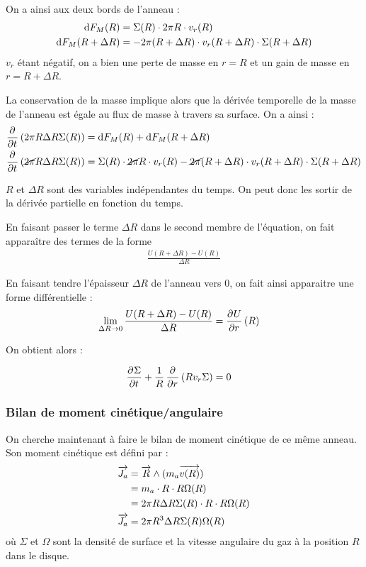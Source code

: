 On a ainsi aux deux bords de l'anneau :
\begin{subequations}
\begin{align}
\operatorname{d \!} F_M(R) &= \Sigma(R) \cdot 2\pi R \cdot v_r(R)\\
\operatorname{d \!} F_M(R+\Delta R) &= - 2\pi (R+\Delta R) \cdot v_r(R+\Delta R) \cdot \Sigma(R+\Delta R)
\end{align}\label{eq:dif_F_M}
\end{subequations}
$v_r$ étant négatif, on a bien une perte de masse en $r=R$ et un gain de masse en $r=R+\Delta R$.

La conservation de la masse implique alors que la dérivée temporelle de la masse de l'anneau est égale au flux de masse à travers sa surface. On a ainsi : 
\begin{align*}
\mathinner{ \dfrac{\partial{^{}}}{\partial{{t}^{}}} }\left(2\pi R \Delta R \Sigma(R)\right) &= \operatorname{d \!} F_M(R) + \operatorname{d \!} F_M(R+\Delta R)\\
\mathinner{ \dfrac{\partial{^{}}}{\partial{{t}^{}}} }\left(\cancel{2\pi}R \Delta R \Sigma(R)\right) &= \Sigma(R) \cdot \cancel{2\pi} R \cdot v_r(R) - \cancel{2\pi} (R+\Delta R) \cdot v_r(R+\Delta R) \cdot \Sigma(R+\Delta R)
\end{align*}

$R$ et $\Delta R$ sont des variables indépendantes du temps. On peut donc les sortir de la dérivée partielle en fonction du temps. 

En faisant passer le terme $\Delta R$ dans le second membre de l'équation, on fait apparaître des termes de la forme 
\begin{align*}
\frac{U(R+\Delta R) - U(R)}{\Delta R}
\end{align*}

En faisant tendre l'épaisseur $\Delta R$ de l'anneau vers 0, on fait ainsi apparaitre une forme différentielle : 
\begin{align*}
\lim_{\Delta R \rightarrow 0} \frac{U(R+\Delta R) - U(R)}{\Delta R} &= \mathinner{ \dfrac{\partial{^{}}U}{\partial{{r}^{}}} }(R)
\end{align*}

On obtient alors :
\begin{important}
\begin{align}
\mathinner{ \dfrac{\partial{^{}}\Sigma}{\partial{{t}^{}}} } + \frac{1}{R}\mathinner{ \dfrac{\partial{^{}}}{\partial{{r}^{}}} }\left(R v_r \Sigma\right)&=0\label{eq:conservation_masse}
\end{align}
\end{important}

\subsubsection{Bilan de moment cinétique/angulaire}
On cherche maintenant à faire le bilan de moment cinétique de ce même anneau. Son moment cinétique est défini par :
\begin{align}
\vect{J_a} &= \vect{R} \wedge (m_a\vect{v(R)}) \nonumber\\
&= m_a \cdot R \cdot R\Omega(R)\nonumber\\
&= 2\pi R \Delta R \Sigma(R)\cdot R \cdot R\Omega(R)\nonumber\\
\vect{J_a} &= 2\pi R^3 \Delta R \Sigma(R)\Omega(R)\label{eq:J_a}
\end{align}
où $\Sigma$ et $\Omega$ sont la densité de surface et la vitesse angulaire du gaz à la position $R$ dans le disque.

